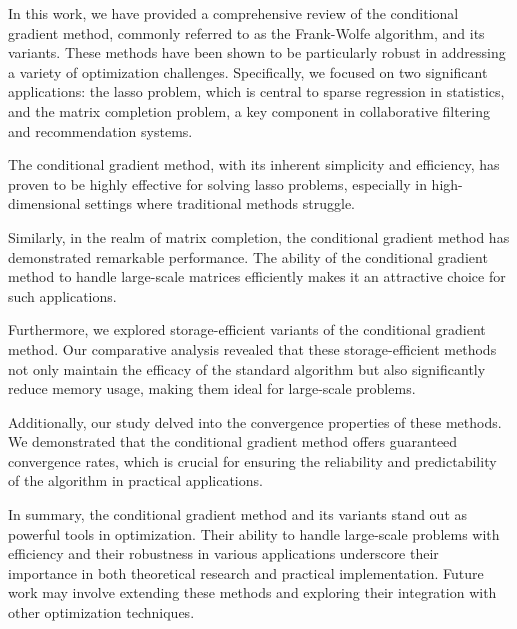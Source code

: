 \documentclass[10pt, twocolumn, reqno, a4paper,oneside]{amsart}
\numberwithin{equation}{section}
\numberwithin{theorem}{section}
\numberwithin{figure}{section}
\numberwithin{table}{section}
\numberwithin{theorem}{section}
\numberwithin{equation}{section}
\begin{document}
In this work, we have provided a comprehensive review of the conditional gradient method, commonly referred to as the Frank-Wolfe algorithm, and its variants. These methods have been shown to be particularly robust in addressing a variety of optimization challenges. Specifically, we focused on two significant applications: the lasso problem, which is central to sparse regression in statistics, and the matrix completion problem, a key component in collaborative filtering and recommendation systems.

The conditional gradient method, with its inherent simplicity and efficiency, has proven to be highly effective for solving lasso problems, especially in high-dimensional settings where traditional methods struggle.

Similarly, in the realm of matrix completion, the conditional gradient method has demonstrated remarkable performance. The ability of the conditional gradient method to handle large-scale matrices efficiently makes it an attractive choice for such applications.

Furthermore, we explored storage-efficient variants of the conditional gradient method. Our comparative analysis revealed that these storage-efficient methods not only maintain the efficacy of the standard algorithm but also significantly reduce memory usage, making them ideal for large-scale problems.

Additionally, our study delved into the convergence properties of these methods. We demonstrated that the conditional gradient method offers guaranteed convergence rates, which is crucial for ensuring the reliability and predictability of the algorithm in practical applications.

In summary, the conditional gradient method and its variants stand out as powerful tools in optimization. Their ability to handle large-scale problems with efficiency and their robustness in various applications underscore their importance in both theoretical research and practical implementation. Future work may involve extending these methods and exploring their integration with other optimization techniques.




\end{document}
